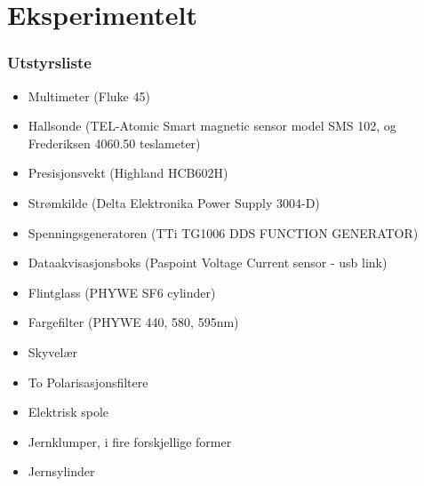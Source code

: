 \documentclass[%
 reprint,
 amsmath,amssymb,
 aps,
 norsk,
]{revtex4-1}
\begin{document}
\section{Eksperimentelt}
\subsubsection{Utstyrsliste}
\begin{itemize}
  \item Multimeter (Fluke 45)
  \item Hallsonde (TEL-Atomic Smart magnetic sensor model SMS 102, og Frederiksen 4060.50 teslameter)
  \item Presisjonsvekt (Highland HCB602H)
  \item Strømkilde (Delta Elektronika Power Supply 3004-D)
  \item Spenningsgeneratoren (TTi TG1006 DDS FUNCTION GENERATOR)
  \item Dataakvisasjonsboks (Paspoint Voltage Current sensor - usb link)
  \item Flintglass (PHYWE SF6 cylinder)
  \item Fargefilter (PHYWE 440, 580, 595nm)
  \item Skyvelær
  \item To Polarisasjonsfiltere
  \item Elektrisk spole
  \item Jernklumper, i fire forskjellige former
  \item Jernsylinder
\end{itemize}
\end{document}
